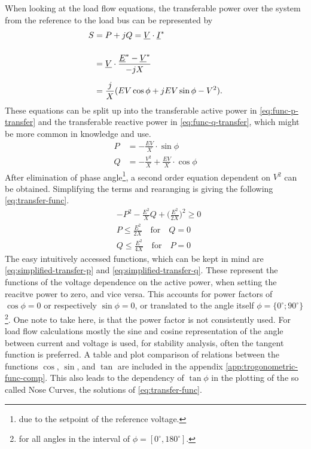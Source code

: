When looking at the load flow equations, the transferable power over the system from the reference to the load bus can be represented by
\begin{align}
    S&=P + jQ = \underline{V} \cdot \underline{I}^* \notag \\[12pt]
    &=\underline{V} \cdot \frac{\underline{E}^* - \underline{V}^*}{-jX} \notag \\[6pt]
    &=\frac{j}{X} (EV \cos \phi + jEV \sin \phi -V^2). \notag
\end{align}
These equations can be split up into the transferable active power in \autoref{eq:func-p-transfer} and the transferable reactive power in \autoref{eq:func-q-transfer}, which might be more common in knowledge and use.
\begin{align}
    P&=-\frac{EV}{X} \cdot \sin \phi \label{eq:func-p-transfer} \\[6pt]
    Q&=-\frac{V^2}{X} + \frac{EV}{X} \cdot \cos \phi \label{eq:func-q-transfer}
\end{align}
After elimination of phase angle\footnote{due to the setpoint of the reference voltage.}, a second order equation dependent on $V^2$ can be obtained.
Simplifying the terms and rearanging is giving the following \autoref{eq:transfer-func}.
\begin{align}
    &-P^2 - \frac{E^2}{X}Q + \bigg(\frac{E^2}{2X}\bigg)^2 \geq 0 \label{eq:transfer-func} \\[12pt]
    &P \leq \frac{E^2}{2X} \quad\text{for}\quad Q=0 \label{eq:simplified-transfer-p} \\[6pt]
    &Q \leq \frac{E^2}{4X} \quad\text{for}\quad P=0 \label{eq:simplified-transfer-q}
\end{align}
The easy intuitively accessed functions, which can be kept in mind are \autoref{eq:simplified-transfer-p} and \autoref{eq:simplified-transfer-q}.
These represent the functions of the voltage dependence on the active power, when setting the reacitve power to zero, and vice versa. 
This accounts for power factors of $\cos \phi = 0$ or respectively $\sin \phi = 0$, or translated to the angle itself $\phi = \{0^\circ; 90^\circ\}$\footnote{for all angles in the interval of $\phi = [0^\circ, 180^\circ]$.}.
One note to take here, is that the power factor is not consistently used.
For load flow calculations mostly the sine and cosine representation of the angle between current and voltage is used, for stability analysis, often the tangent function is preferred.
A table and plot comparison of relations between the functions $\cos$, $\sin$, and $\tan$ are included in the appendix \autoref{app:trogonometric-func-comp}. 
This also leads to the dependency of $\tan \phi$ in the plotting of the so called Nose Curves, the solutions of \autoref{eq:transfer-func}.

